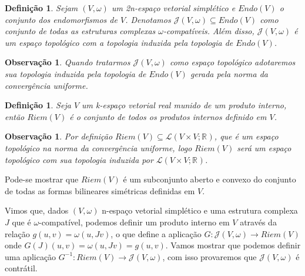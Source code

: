 \documentclass[12pt]{book}
\newtheorem{definicao}[teorema]{Definição}
\newtheorem{observacao}[teorema]{Observação}
\newcommand{\estruturascomplexaspadrao}{\mathcal{J}(V, \omega)}
\newcommand{\produtosinternos}[1]{Riem(#1)}
\newcommand{\real}[1]{\mathbb{R}^{#1}}
\newcommand{\vermelho}[1]{{\color{red}#1}}
\begin{document}
	\begin{definicao} \label{definicao_conjunto_estrutura_complexa}
		Sejam $(V,\omega)$ um 2n-espaço vetorial simplético e $Endo(V)$ o conjunto dos endomorfismos de $V$. Denotamos $\estruturascomplexaspadrao \subseteq Endo(V)$ como conjunto de todas as estruturas complexas $\omega$-compatíveis. Além disso, $\estruturascomplexaspadrao$ é um espaço topológico com a topologia induzida pela topologia de $Endo(V)$.
	\end{definicao}
	
	\begin{observacao}\label{observacao_conjunto_estrutura_complexa}
		Quando tratarmos $\estruturascomplexaspadrao$ como espaço topológico adotaremos sua topologia induzida pela topologia de $Endo(V)$ gerada pela norma da convergência uniforme.
	\end{observacao}

	\begin{definicao}
		Seja $V$ um k-espaço vetorial real munido de um produto interno, então $\produtosinternos{V}$ é o conjunto de todos os produtos internos definido em $V$.
	\end{definicao}
	
	\begin{observacao}
		Por definição $\produtosinternos{V} \subseteq \mathcal{L}(V \times V; \real{})$, que é um espaço topológico na norma da convergência uniforme, logo $\produtosinternos{V}$ será um espaço topológico com sua topologia induzida por $\mathcal{L}(V \times V; \real{})$.
	\end{observacao} 
	
	\vermelho{Pode-se mostrar que $\produtosinternos{V}$ é um subconjunto aberto e convexo do conjunto de todas as formas bilineares simétricas definidas em $V$}.
	
	Vimos que, dados $(V, \omega)$ n-espaço vetorial simplético e uma estrutura complexa $J$ que é $\omega$-compatível, podemos definir um produto interno em $V$ através da relação $g(u,v) = \omega(u,Jv)$, o que define a aplicação $G:\estruturascomplexaspadrao \to \produtosinternos{V}$ onde $G(J)(u,v) = \omega(u,Jv) = g(u,v)$. Vamos mostrar que podemos definir uma aplicação $G^{-1}: \produtosinternos{V} \to \estruturascomplexaspadrao$, com isso provaremos que $\estruturascomplexaspadrao$ é contrátil.
	
\end{document}
